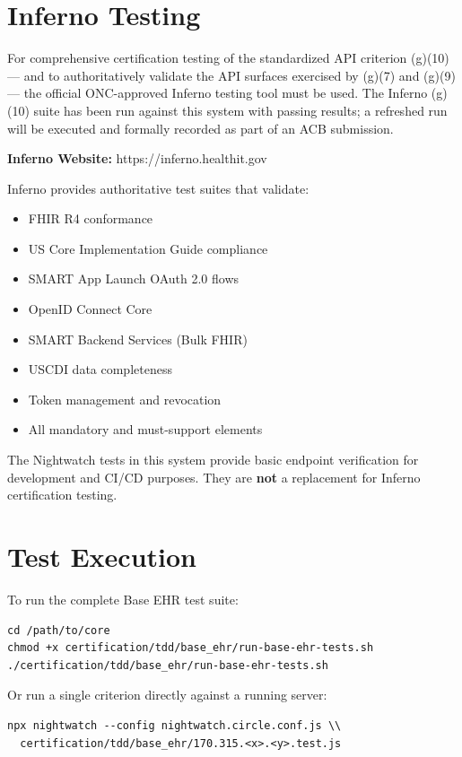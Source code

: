 \section{Inferno Testing}

For comprehensive certification testing of the standardized API criterion (g)(10) --- and to authoritatively validate the API surfaces exercised by (g)(7) and (g)(9) --- the official ONC-approved Inferno testing tool must be used. The Inferno (g)(10) suite has been run against this system with passing results; a refreshed run will be executed and formally recorded as part of an ACB submission.

\textbf{Inferno Website:} https://inferno.healthit.gov

Inferno provides authoritative test suites that validate:
\begin{itemize}
\item FHIR R4 conformance
\item US Core Implementation Guide compliance
\item SMART App Launch OAuth 2.0 flows
\item OpenID Connect Core
\item SMART Backend Services (Bulk FHIR)
\item USCDI data completeness
\item Token management and revocation
\item All mandatory and must-support elements
\end{itemize}

The Nightwatch tests in this system provide basic endpoint verification for development and CI/CD purposes. They are \textbf{not} a replacement for Inferno certification testing.

\section{Test Execution}

To run the complete Base EHR test suite:

\begin{Verbatim}[commandchars=\\\{\}]
cd /path/to/core
chmod +x certification/tdd/base_ehr/run-base-ehr-tests.sh
./certification/tdd/base_ehr/run-base-ehr-tests.sh
\end{Verbatim}

Or run a single criterion directly against a running server:

\begin{Verbatim}[commandchars=\\\{\}]
npx nightwatch --config nightwatch.circle.conf.js \\
  certification/tdd/base_ehr/170.315.<x>.<y>.test.js
\end{Verbatim}

